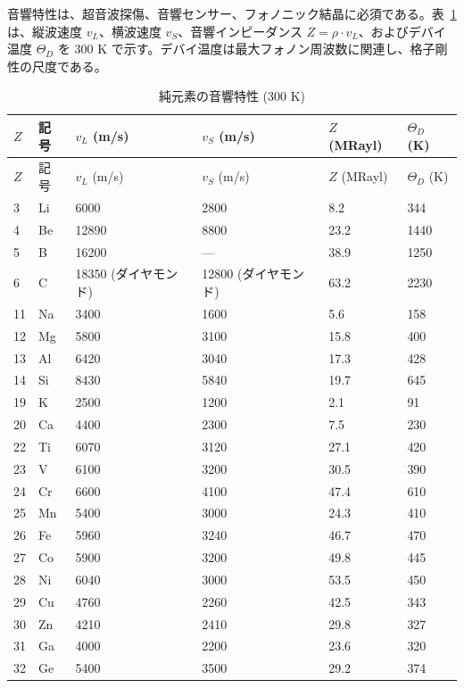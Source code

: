 \documentclass[11pt,a4paper]{article}
\theoremstyle{remark}
\begin{document}
	音響特性は、超音波探傷、音響センサー、フォノニック結晶に必須である。表~\ref{tab:acoustic-properties-func} は、縦波速度 \(v_L\)、横波速度 \(v_S\)、音響インピーダンス \(Z = \rho \cdot v_L\)、およびデバイ温度 \(\Theta_D\) を 300 K で示す。デバイ温度は最大フォノン周波数に関連し、格子剛性の尺度である。
	
	\begin{longtable}{p{0.8cm}p{1.2cm}p{2.2cm}p{2.2cm}p{2.2cm}p{2.2cm}}
		\caption{純元素の音響特性 (300 K)} \label{tab:acoustic-properties-func} \\
		\toprule
		\(Z\) & 記号 & \(v_L\) (m/s) & \(v_S\) (m/s) & \(Z\) (MRayl) & \(\Theta_D\) (K) \\
		\midrule
		\endfirsthead
		\toprule
		\(Z\) & 記号 & \(v_L\) (m/s) & \(v_S\) (m/s) & \(Z\) (MRayl) & \(\Theta_D\) (K) \\
		\midrule
		\endhead
		3  & Li & 6000 & 2800 & 8.2 & 344 \\
		4  & Be & 12890 & 8800 & 23.2 & 1440 \\
		5  & B  & 16200 & --- & 38.9 & 1250 \\
		6  & C  & 18350 (ダイヤモンド) & 12800 (ダイヤモンド) & 63.2 & 2230 \\
		11 & Na & 3400 & 1600 & 5.6 & 158 \\
		12 & Mg & 5800 & 3100 & 15.8 & 400 \\
		13 & Al & 6420 & 3040 & 17.3 & 428 \\
		14 & Si & 8430 & 5840 & 19.7 & 645 \\
		19 & K  & 2500 & 1200 & 2.1 & 91 \\
		20 & Ca & 4400 & 2300 & 7.5 & 230 \\
		22 & Ti & 6070 & 3120 & 27.1 & 420 \\
		23 & V  & 6100 & 3200 & 30.5 & 390 \\
		24 & Cr & 6600 & 4100 & 47.4 & 610 \\
		25 & Mn & 5400 & 3000 & 24.3 & 410 \\
		26 & Fe & 5960 & 3240 & 46.7 & 470 \\
		27 & Co & 5900 & 3200 & 49.8 & 445 \\
		28 & Ni & 6040 & 3000 & 53.5 & 450 \\
		29 & Cu & 4760 & 2260 & 42.5 & 343 \\
		30 & Zn & 4210 & 2410 & 29.8 & 327 \\
		31 & Ga & 4000 & 2200 & 23.6 & 320 \\
		32 & Ge & 5400 & 3500 & 29.2 & 374 \\

\end{longtable}
\end{document}
